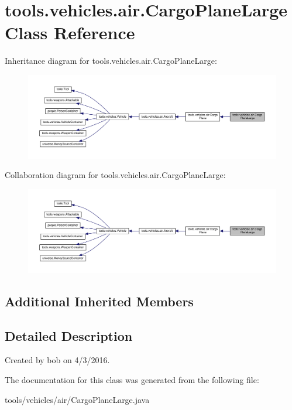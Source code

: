 \hypertarget{classtools_1_1vehicles_1_1air_1_1_cargo_plane_large}{}\section{tools.\+vehicles.\+air.\+Cargo\+Plane\+Large Class Reference}
\label{classtools_1_1vehicles_1_1air_1_1_cargo_plane_large}


Inheritance diagram for tools.\+vehicles.\+air.\+Cargo\+Plane\+Large\+:\nopagebreak
\begin{figure}[H]
\begin{center}
\leavevmode
\includegraphics[width=350pt]{classtools_1_1vehicles_1_1air_1_1_cargo_plane_large__inherit__graph}
\end{center}
\end{figure}


Collaboration diagram for tools.\+vehicles.\+air.\+Cargo\+Plane\+Large\+:\nopagebreak
\begin{figure}[H]
\begin{center}
\leavevmode
\includegraphics[width=350pt]{classtools_1_1vehicles_1_1air_1_1_cargo_plane_large__coll__graph}
\end{center}
\end{figure}
\subsection*{Additional Inherited Members}


\subsection{Detailed Description}
Created by bob on 4/3/2016. 

The documentation for this class was generated from the following file\+:\begin{DoxyCompactItemize}
\item 
tools/vehicles/air/Cargo\+Plane\+Large.\+java\end{DoxyCompactItemize}
